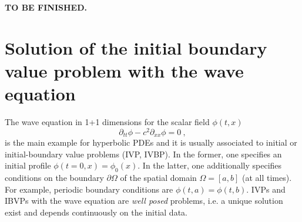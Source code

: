 
{\bf TO BE FINISHED.}

\section{Solution of the initial boundary value problem with the wave equation}

  The wave equation in 1+1 dimensions for the scalar field $\phi(t,x)$
  \begin{equation}\label{eq:waveq:2}
    \partial_{tt} \phi - c^2 \partial_{xx} \phi = 0  \ ,
  \end{equation}
  is the main example for hyperbolic PDEs and it is usually associated to initial or initial-boundary value problems
  (IVP, IVBP). In the former, one specifies an initial profile
  $\phi(t=0,x)=\phi_0(x)$. In the latter, one additionally specifies conditions
  on the boundary $\partial\Omega$ of the spatial domain
  $\Omega=[a,b]$ (at all times). For example, periodic boundary
  conditions are $\phi(t,a)=\phi(t,b)$. IVPs and IBVPs with the wave
  equation are {\it well posed} problems, i.e. a unique solution exist
  and depends continuously on the initial data.
